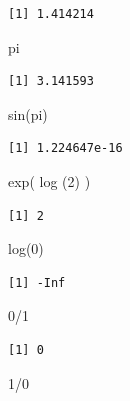 \documentclass[
  italian,
  letterpaper,
]{book}
\newenvironment{Shaded}{\begin{snugshade}}{\end{snugshade}}
\newcommand{\DecValTok}[1]{\textcolor[rgb]{0.68,0.00,0.00}{#1}}
\newcommand{\FunctionTok}[1]{\textcolor[rgb]{0.28,0.35,0.67}{#1}}
\newcommand{\NormalTok}[1]{\textcolor[rgb]{0.00,0.23,0.31}{#1}}
\newcommand{\SpecialCharTok}[1]{\textcolor[rgb]{0.37,0.37,0.37}{#1}}
\theoremstyle{definition}
\theoremstyle{remark}
\begin{document}
\begin{verbatim}
[1] 1.414214
\end{verbatim}

\begin{Shaded}
\begin{Highlighting}[]
\NormalTok{pi}
\end{Highlighting}
\end{Shaded}

\begin{verbatim}
[1] 3.141593
\end{verbatim}

\begin{Shaded}
\begin{Highlighting}[]
\FunctionTok{sin}\NormalTok{(pi)}
\end{Highlighting}
\end{Shaded}

\begin{verbatim}
[1] 1.224647e-16
\end{verbatim}

\begin{Shaded}
\begin{Highlighting}[]
\FunctionTok{exp}\NormalTok{( }\FunctionTok{log}\NormalTok{ (}\DecValTok{2}\NormalTok{) )}
\end{Highlighting}
\end{Shaded}

\begin{verbatim}
[1] 2
\end{verbatim}

\begin{Shaded}
\begin{Highlighting}[]
\FunctionTok{log}\NormalTok{(}\DecValTok{0}\NormalTok{)}
\end{Highlighting}
\end{Shaded}

\begin{verbatim}
[1] -Inf
\end{verbatim}

\begin{Shaded}
\begin{Highlighting}[]
\DecValTok{0}\SpecialCharTok{/}\DecValTok{1}
\end{Highlighting}
\end{Shaded}

\begin{verbatim}
[1] 0
\end{verbatim}

\begin{Shaded}
\begin{Highlighting}[]
\DecValTok{1}\SpecialCharTok{/}\DecValTok{0}
\end{Highlighting}
\end{Shaded}
\end{document}
